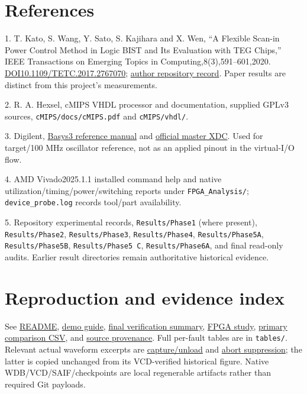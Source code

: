 \documentclass[11pt,a4paper]{article}
\begin{document}
\section{References}


1. T. Kato, S. Wang, Y. Sato, S. Kajihara and X. Wen, ``A Flexible Scan-in Power Control Method in Logic BIST and Its Evaluation with TEG Chips,'' IEEE Transactions on Emerging Topics in Computing,8(3),591--601,2020. \href{https://doi.org/10.1109/TETC.2017.2767070}{DOI10.1109/TETC.2017.2767070}; \href{https://kyutech.repo.nii.ac.jp/records/6935}{author repository record}. Paper results are distinct from this project's measurements.

2. R. A. Hexsel, cMIPS VHDL processor and documentation, supplied GPLv3 sources, \texttt{cMIPS/docs/cMIPS.pdf} and \texttt{cMIPS/vhdl/}.

3. Digilent, \href{https://digilent.com/reference/_media/basys3\%3A\%20basys3_rm.pdf}{Basys3 reference manual} and \href{https://github.com/Digilent/digilent-xdc/blob/master/Basys-3-Master.xdc}{official master XDC}. Used for target/100 MHz oscillator reference, not as an applied pinout in the virtual-I/O flow.

4. AMD Vivado2025.1.1 installed command help and native utilization/timing/power/switching reports under \texttt{FPGA\_Analysis/}; \texttt{device\_probe.log} records tool/part availability.

5. Repository experimental records, \texttt{Results/Phase1} (where present), \texttt{Results/Phase2}, \texttt{Results/Phase3}, \texttt{Results/Phase4}, \texttt{Results/Phase5A}, \texttt{Results/Phase5B}, \texttt{Results/Phase5 C}, \texttt{Results/Phase6A}, and final read-only audits. Earlier result directories remain authoritative historical evidence.



\section{Reproduction and evidence index}


See \href{README.md}{README}, \href{DEMO.md}{demo guide}, \href{final_verification_summary.md}{final verification summary}, \href{FPGA_Analysis/README.md}{FPGA study}, \href{final_experimental_comparison.csv}{primary comparison CSV}, and \href{source_manifest.csv}{source provenance}. Full per-fault tables are in \texttt{tables/}. Relevant actual waveform excerpts are \href{figures/scan_capture_unload.png}{capture/unload} and \href{figures/misr_abort.svg}{abort suppression}; the latter is copied unchanged from its VCD-verified historical figure. Native WDB/VCD/SAIF/checkpoints are local regenerable artifacts rather than required Git payloads.
\end{document}
